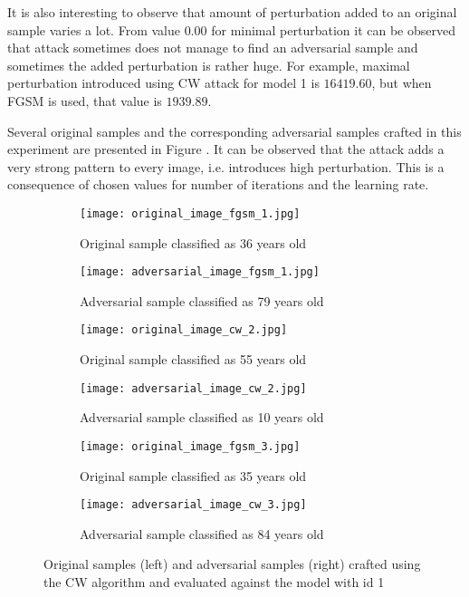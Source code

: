  It is also interesting to observe that amount of perturbation added to an original sample varies a lot. From value $0.00$ for minimal perturbation it can be observed that attack sometimes does not manage to find an adversarial sample and sometimes the added perturbation is rather huge. For example, maximal perturbation introduced using CW attack for model 1 is $16419.60$, but when FGSM is used, that value is $1939.89$.

Several original samples and the corresponding adversarial samples crafted in this experiment are presented in Figure \label{fig:cw-attack}. It can be observed that the attack adds a very strong pattern to every image, i.e. introduces high perturbation. This is a consequence of chosen values for number of iterations and the learning rate. 

\begin{figure}

\begin{subfigure}{.5\textwidth}
  \centering
  \texttt{[image: original\_image\_fgsm\_1.jpg]}
  \caption{Original sample classified as 36 years old}
\end{subfigure}
\begin{subfigure}{.5\textwidth}
  \centering
  \texttt{[image: adversarial\_image\_fgsm\_1.jpg]}
  \caption{Adversarial sample classified as 79 years old}
\end{subfigure}

\begin{subfigure}{.5\textwidth}
  \centering
  \texttt{[image: original\_image\_cw\_2.jpg]}
  \caption{Original sample classified as 55 years old}
\end{subfigure}
\begin{subfigure}{.5\textwidth}
  \centering
  \texttt{[image: adversarial\_image\_cw\_2.jpg]}
  \caption{Adversarial sample classified as 10 years old}
\end{subfigure}

\begin{subfigure}{.5\textwidth}
  \centering
  \texttt{[image: original\_image\_fgsm\_3.jpg]}
  \caption{Original sample classified as 35 years old}
\end{subfigure}
\begin{subfigure}{.5\textwidth}
  \centering
  \texttt{[image: adversarial\_image\_cw\_3.jpg]}
  \caption{Adversarial sample classified as 84 years old}
\end{subfigure}

\caption{Original samples (left) and adversarial samples (right) crafted using the CW algorithm and evaluated against the model with id 1}
\label{fig:cw-attack}
\end{figure}


